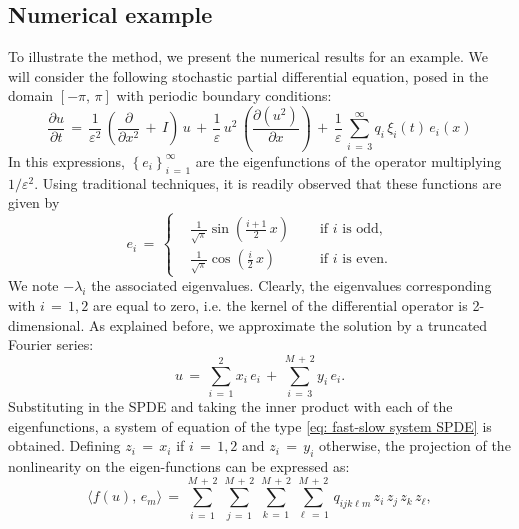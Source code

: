 \subsection{Numerical example}
\label{sub:numerical_example}
To illustrate the method, we present the numerical results for an example. We will consider the following stochastic partial differential equation, posed in the domain $ [ -{\pi},\,{\pi}]$ with periodic boundary conditions:
\begin{equation}
    \frac{{\partial}u}{{\partial}t} \,=\,\frac{1}{{\varepsilon}^2}\, \left( \frac{\partial}{{\partial}x^2} \,+\,I\right)\,u \,+\, \frac{1}{\varepsilon} \, u^2\,\left(\frac{{\partial}(u^2)}{{\partial}x}\right) \,+\, \frac{1}{\varepsilon} \, \sum_{ i\,=\,3}^{ {\infty}}  q_i\,{\xi}_i(t)\, e_i(x) 
    \label{eq: undefined label}
\end{equation}
In this expressions, $\left\{e_i\right\}_{i\,=\,1}^{\infty}$ are the eigenfunctions of the operator multiplying $1/{\varepsilon}^2$. Using traditional techniques, it is readily observed that these functions are given by
\begin{equation*}
    e_i \,=\, \left\{
        \begin{aligned}
            & \frac{1}{\sqrt{\pi}}\sin\left(\frac{i+1}{2}\,x\right) &\quad \text{ if $i$ is odd,} \\
            & \frac{1}{\sqrt {\pi}}\cos\left(\frac{i}{2}\,x\right) &\quad \text{ if $i$ is even.}
        \end{aligned} \right .
\end{equation*}
We note $-{\lambda}_i$ the associated eigenvalues. Clearly, the eigenvalues corresponding with $i \,=\,1,2$ are equal to zero, i.e. the kernel of the differential operator is 2-dimensional. As explained before, we approximate the solution by a truncated Fourier series:
\begin{equation*}
    u \,=\, \sum_{ i\,=\,1}^{ 2} x_i\,e_i \,+\, \sum_{ i\,=\,3}^{ M\,+\,2} y_i \, e_i.
\end{equation*}
Substituting in the SPDE and taking the inner product with each of the eigenfunctions, a system of equation of the type \eqref{eq: fast-slow system SPDE} is obtained. Defining $z_i \,=\, x_i$ if $i \,=\,1,2$ and $z_i \,=\,y_i$ otherwise, the projection of the nonlinearity on the eigen-functions can be expressed as:
\begin{equation}
    \langle f(u),\,e_m\rangle \,=\,\sum_{ i\,=\,1}^{ M\,+\,2}\, \sum_{ j\,=\,1}^{ M\,+\,2}\,\sum_{ k\,=\,1}^{ M\,+\,2}\,\sum_{ {\ell}\,=\,1}^{ M\,+\,2}\, q_{ijk{\ell}m} \, z_i\,z_j\,z_k\,z_{\ell}, 
    \label{eq: projection nonlin example 1}
\end{equation}
